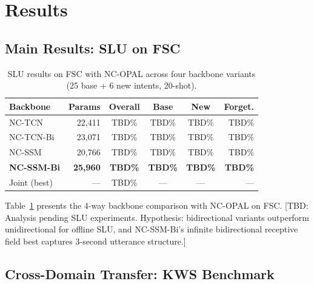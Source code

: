\documentclass[11pt]{article}
\begin{document}
\section{Results}

\subsection{Main Results: SLU on FSC}

\begin{table}[t]
\centering
\small
\caption{SLU results on FSC with NC-OPAL across four backbone variants (25 base + 6 new intents, 20-shot).}
\label{tab:main}
\begin{tabular}{@{}lrcccr@{}}
\toprule
\textbf{Backbone} & \textbf{Params} & \textbf{Overall} & \textbf{Base} & \textbf{New} & \textbf{Forget.} \\
\midrule
NC-TCN       & 22,411 & TBD\% & TBD\% & TBD\% & TBD\% \\
NC-TCN-Bi    & 23,071 & TBD\% & TBD\% & TBD\% & TBD\% \\
NC-SSM       & 20,766 & TBD\% & TBD\% & TBD\% & TBD\% \\
\textbf{NC-SSM-Bi} & \textbf{25,960} & \textbf{TBD\%} & \textbf{TBD\%} & \textbf{TBD\%} & \textbf{TBD\%} \\
\midrule
Joint (best) & --- & TBD\% & --- & --- & --- \\
\bottomrule
\end{tabular}
\end{table}

Table~\ref{tab:main} presents the 4-way backbone comparison with NC-OPAL on FSC.
[TBD: Analysis pending SLU experiments.
Hypothesis: bidirectional variants outperform unidirectional for offline SLU,
and NC-SSM-Bi's infinite bidirectional receptive field best captures 3-second utterance structure.]

\subsection{Cross-Domain Transfer: KWS Benchmark}
\end{document}
